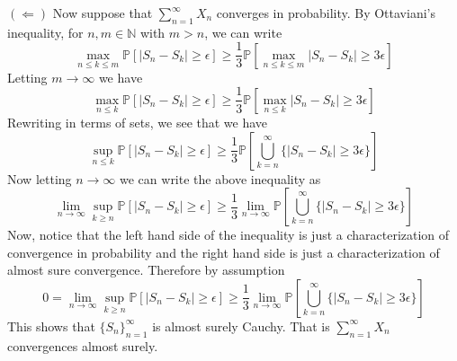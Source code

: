 \documentclass[12pt]{article}  %
\newcommand{\N}{{\mathbb{N}}}
\newcommand{\e}{{\epsilon}}
\newcommand{\prob}{{\mathbb{P}}}
\begin{document}
\begin{enumerate}
$(\Longleftarrow)$ Now suppose that $\sum_{n=1}^{\infty}X_n$ converges in probability. By Ottaviani’s inequality, for $n,m\in\N$ with $m>n$, we can write $$\max_{n\leq k\leq m}\prob[|S_n - S_k|\geq \e]\geq \frac{1}{3}\prob[\max_{n\leq k \leq m}|S_n - S_k|\geq 3\e]$$ Letting $m\to\infty$ we have 
$$\max_{n\leq k}\prob[|S_n - S_k|\geq \e]\geq \frac{1}{3}\prob[\max_{n\leq k}|S_n - S_k|\geq 3\e]$$ Rewriting in terms of sets, we see that we have $$\sup_{n\leq k}\prob[|S_n - S_k|\geq \e]\geq \frac{1}{3}\prob[\bigcup_{k = n}^{\infty}\{|S_n - S_k|\geq 3\e\}]$$ Now letting $n\to\infty$ we can write the above inequality as $$\lim_{n\to\infty}\sup_{k\geq n}\prob[|S_n - S_k|\geq \e]\geq \frac{1}{3}\lim_{n\to\infty}\prob[\bigcup_{k = n}^{\infty}\{|S_n - S_k|\geq 3\e\}]$$
Now, notice that the left hand side of the inequality is just a characterization of convergence in probability and the right hand side is just a characterization of almost sure convergence. Therefore by assumption $$0 = \lim_{n\to\infty}\sup_{k\geq n}\prob[|S_n - S_k|\geq \e]\geq \frac{1}{3}\lim_{n\to\infty}\prob[\bigcup_{k = n}^{\infty}\{|S_n - S_k|\geq 3\e\}]$$ This shows that  $\{S_n\}_{n=1}^{\infty}$ is almost surely Cauchy. That is $\sum_{n=1}^{\infty}X_n$ convergences almost surely. 



\end{enumerate}	
\end{document}
